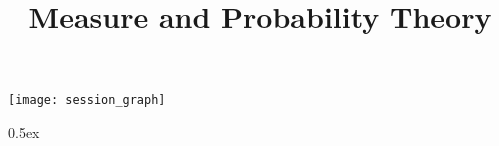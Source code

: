 \documentclass[11pt,a4paper]{article}
\begin{document}
\title{Measure and Probability Theory}
\maketitle

\tableofcontents

\begin{center}
  \texttt{[image: session\_graph]}
\end{center}

\renewcommand{\isamarkupheader}[1]%
{\section{\isabellecontext: #1}\markright{THEORY~``\isabellecontext''}}

\parindent 0pt\parskip 0.5ex

\end{document}
